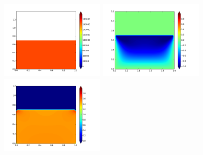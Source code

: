 \documentclass{article}
\begin{document}
\begin{figure}
{\includegraphics[width=2in]{contour-P37-ALEcomp.png} \hspace{-20pt}
\includegraphics[width=2in]{contour-V18-IBcon.png} \hspace{-20pt}
\includegraphics[width=2in]{contour-P18-IBcon.png} 
}
\vspace{-8pt}
\end{figure}
\end{document}
